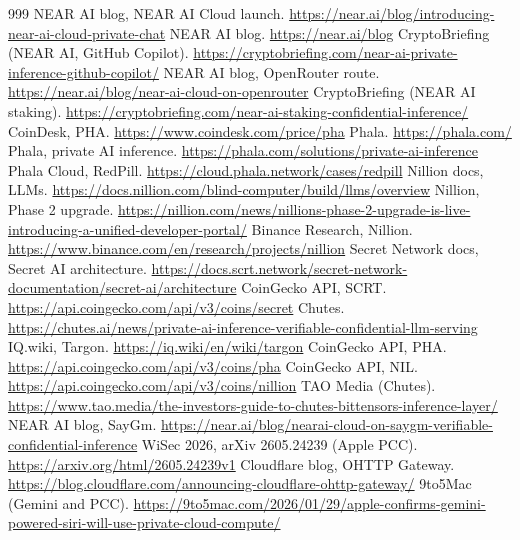 \documentclass[10pt,a4paper]{article}
\begin{document}
\begin{thebibliography}{999}
 NEAR AI blog, NEAR AI Cloud launch. \url{https://near.ai/blog/introducing-near-ai-cloud-private-chat}
 NEAR AI blog. \url{https://near.ai/blog}
 CryptoBriefing (NEAR AI, GitHub Copilot). \url{https://cryptobriefing.com/near-ai-private-inference-github-copilot/}
 NEAR AI blog, OpenRouter route. \url{https://near.ai/blog/near-ai-cloud-on-openrouter}
 CryptoBriefing (NEAR AI staking). \url{https://cryptobriefing.com/near-ai-staking-confidential-inference/}
 CoinDesk, PHA. \url{https://www.coindesk.com/price/pha}
 Phala. \url{https://phala.com/}
 Phala, private AI inference. \url{https://phala.com/solutions/private-ai-inference}
 Phala Cloud, RedPill. \url{https://cloud.phala.network/cases/redpill}
 Nillion docs, LLMs. \url{https://docs.nillion.com/blind-computer/build/llms/overview}
 Nillion, Phase 2 upgrade. \url{https://nillion.com/news/nillions-phase-2-upgrade-is-live-introducing-a-unified-developer-portal/}
 Binance Research, Nillion. \url{https://www.binance.com/en/research/projects/nillion}
 Secret Network docs, Secret AI architecture. \url{https://docs.scrt.network/secret-network-documentation/secret-ai/architecture}
 CoinGecko API, SCRT. \url{https://api.coingecko.com/api/v3/coins/secret}
 Chutes. \url{https://chutes.ai/news/private-ai-inference-verifiable-confidential-llm-serving}
 IQ.wiki, Targon. \url{https://iq.wiki/en/wiki/targon}
 CoinGecko API, PHA. \url{https://api.coingecko.com/api/v3/coins/pha}
 CoinGecko API, NIL. \url{https://api.coingecko.com/api/v3/coins/nillion}
 TAO Media (Chutes). \url{https://www.tao.media/the-investors-guide-to-chutes-bittensors-inference-layer/}
 NEAR AI blog, SayGm. \url{https://near.ai/blog/nearai-cloud-on-saygm-verifiable-confidential-inference}
 WiSec 2026, arXiv 2605.24239 (Apple PCC). \url{https://arxiv.org/html/2605.24239v1}
 Cloudflare blog, OHTTP Gateway. \url{https://blog.cloudflare.com/announcing-cloudflare-ohttp-gateway/}
 9to5Mac (Gemini and PCC). \url{https://9to5mac.com/2026/01/29/apple-confirms-gemini-powered-siri-will-use-private-cloud-compute/}

\end{thebibliography}
\end{document}
